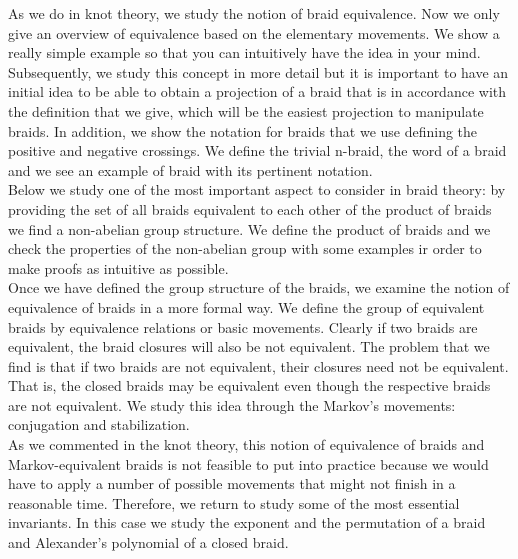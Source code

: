 As we do in knot theory, we study the notion of braid equivalence. Now we only give an overview of equivalence based on the elementary movements. We show a really simple example so that you can intuitively have the idea in your mind. Subsequently, we study this concept in more detail but it is important to have an initial idea to be able to obtain a projection of a braid that is in accordance with the definition that we give, which will be the easiest projection to manipulate braids. In addition, we show the notation for braids that we use defining the positive and negative crossings. We define the trivial n-braid, the word of a braid and we see an example of braid with its pertinent notation.\\










Below we study one of the most important aspect to consider in braid theory: by providing the set of all braids equivalent to each other of the product of braids we find a non-abelian group structure. We define the product of braids and we check the properties of the non-abelian group with some examples ir order to make proofs as intuitive as possible.\\

Once we have defined the group structure of the braids, we examine the notion of equivalence of braids in a more formal way. We define the group of equivalent braids by equivalence relations or basic movements. Clearly if two braids are equivalent, the braid closures will also be not equivalent. The problem that we find is that if two braids are not equivalent, their closures need not be equivalent. That is, the closed braids may be equivalent even though the respective braids are not equivalent. We study this idea through the Markov’s movements: conjugation and stabilization.\\


As we commented in the knot theory, this notion of equivalence of braids and Markov-equivalent braids is not feasible to put into practice because we would have to apply a number of possible movements that might not finish in a reasonable time. Therefore, we return to study some of the most essential invariants. In this case we study the exponent and the permutation of a braid and Alexander's polynomial of a closed braid.\\


